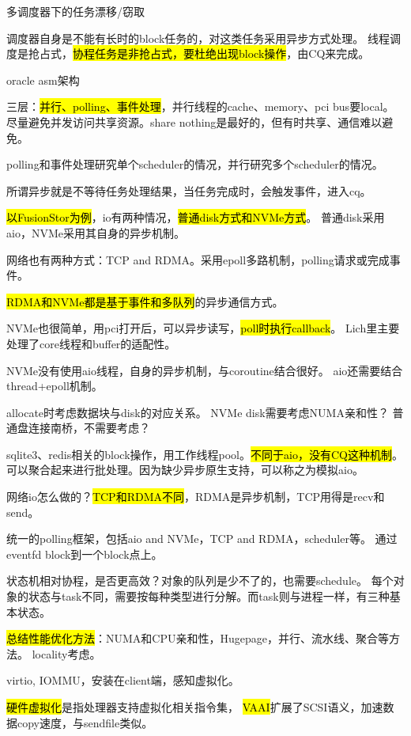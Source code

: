 多调度器下的任务漂移/窃取

调度器自身是不能有长时的block任务的，对这类任务采用异步方式处理。
线程调度是抢占式，\hl{协程任务是非抢占式，要杜绝出现block操作}，由CQ来完成。

oracle asm架构

三层：\hl{并行、polling、事件处理}，并行线程的cache、memory、pci bus要local。
尽量避免并发访问共享资源。share nothing是最好的，但有时共享、通信难以避免。

polling和事件处理研究单个scheduler的情况，并行研究多个scheduler的情况。

\hrulefill

所谓异步就是不等待任务处理结果，当任务完成时，会触发事件，进入cq。

\hl{以FusionStor为例}，io有两种情况，\hl{普通disk方式和NVMe方式}。
普通disk采用aio，NVMe采用其自身的异步机制。

网络也有两种方式：TCP and RDMA。采用epoll多路机制，polling请求或完成事件。

\hl{RDMA和NVMe都是基于事件和多队列}的异步通信方式。

NVMe也很简单，用pci打开后，可以异步读写，\hl{poll时执行callback}。
Lich里主要处理了core线程和buffer的适配性。

NVMe没有使用aio线程，自身的异步机制，与coroutine结合很好。
aio还需要结合thread+epoll机制。

allocate时考虑数据块与disk的对应关系。
NVMe disk需要考虑NUMA亲和性？
普通盘连接南桥，不需要考虑？

sqlite3、redis相关的block操作，用工作线程pool。\hl{不同于aio，没有CQ这种机制}。
可以聚合起来进行批处理。因为缺少异步原生支持，可以称之为模拟aio。

网络io怎么做的？\hl{TCP和RDMA不同}，RDMA是异步机制，TCP用得是recv和send。

统一的polling框架，包括aio and NVMe，TCP and RDMA，scheduler等。
通过eventfd block到一个block点上。

\hrulefill

状态机相对协程，是否更高效？对象的队列是少不了的，也需要schedule。
每个对象的状态与task不同，需要按每种类型进行分解。而task则与进程一样，有三种基本状态。

\hrulefill

\hl{总结性能优化方法}：NUMA和CPU亲和性，Hugepage，并行、流水线、聚合等方法。
locality考虑。

virtio, IOMMU，安装在client端，感知虚拟化。

\hl{硬件虚拟化}是指处理器支持虚拟化相关指令集，
\hl{VAAI}扩展了SCSI语义，加速数据copy速度，与sendfile类似。

